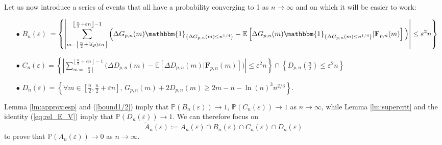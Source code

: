 \documentclass[a4, 11pt]{article}
\numberwithin{equation}{section}
\theoremstyle{plain}
\theoremstyle{definition}
\theoremstyle{remark}
\begin{document}
Let us now introduce a series of events that all have a probability converging to 1 as $n\rightarrow \infty$ and on which it will be easier to work:  

\begin{enumerate}[leftmargin=0.5cm]
\item[$\bullet$]
$  B_n(\varepsilon)${\small{$\displaystyle ~=\left\{\left\vert \sum_{m=\left\lfloor \frac{n}{2}+\tilde{c}(p)\varepsilon n\right\rfloor}^{\left\lfloor\frac{n}{2}+\varepsilon n\right\rfloor-1}\Big(\Delta G_{p,n}(m)\mathbbm{1}_{\{\Delta G_{p,n}(m)\leq n^{1/4}\}}-\mathbb{E}\left[\Delta G_{p,n}(m)\mathbbm{1}_{\{\Delta G_{p,n}(m)\leq n^{1/4}\}}\vert \mathbf{F}_{p,n}(m)   \right]\Big) \right\vert \leq \varepsilon^2 n    \right\}$}}
\item[$\bullet$]  $ \displaystyle C_n(\varepsilon)=\left\{\left\vert \sum_{m=\left\lfloor \frac{n}{2}\right\rfloor }^{\left\lfloor\frac{n}{2}+\varepsilon n\right\rfloor-1}\Big(\Delta D_{p,n}(m)-\mathbb{E}\left[\Delta D_{p,n}(m)\vert \mathbf{F}_{p,n}(m)   \right]\Big) \right\vert \leq \varepsilon^2 n    \right\}\cap \left\{D_{p,n}\left(\frac{n}{2}\right)\leq \varepsilon^2 n \right\}$

\item[$\bullet$] $\displaystyle D_n(\varepsilon)=\left\{\forall m\in \left[\frac{n}{2},\frac{n}{2}+\varepsilon n\right],\, G_{p,n}(m)+2D_{p,n}(m)\geq 2m-n-\ln(n)^3n^{2/3} \right\}.$
\end{enumerate}
 
Lemma \ref{lm:approx:esp} and (\ref{bound1/2}) imply that $\mathbb P(B_n(\varepsilon))\rightarrow 1$, $\mathbb P(C_n(\varepsilon))\rightarrow 1$ as $n \rightarrow \infty$, while  Lemma \ref{lm:supercrit} and the identity (\ref{eq:rel_E_V}) imply that $\mathbb P(D_n(\varepsilon))\rightarrow 1$. We can therefore focus on $$\tilde{A}_n(\varepsilon):=A_n(\varepsilon)\cap B_n(\varepsilon)\cap C_n(\varepsilon)\cap D_n(\varepsilon)$$ to prove that  $\mathbb{P}\left(A_n(\varepsilon)\right) \rightarrow 0$ as $n \rightarrow \infty$.
\end{document}

